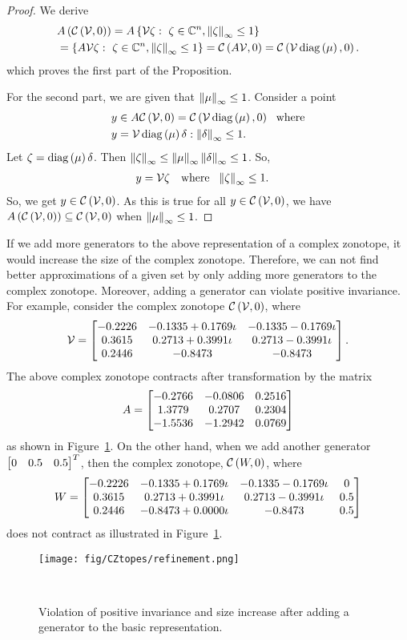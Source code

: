 % 
\begin{proof}
We derive
\begin{align*}
& A\left(\mathit{\mathcal{C}}\left(\mathcal{V},0\right)\right) =
A\left\{\mathcal{V}\zeta:~\zeta\in\mathbb{C}^n,\left\|\zeta\right\|_{\infty}\leq 1\right\}\\
& =\left\{A\mathcal{V}\zeta:~\zeta\in\mathbb{C}^n,\left\|\zeta\right\|_{\infty}\leq 1\right\}
= \mathit{\mathcal{C}}\left(A\mathcal{V},0\right)=\mathit{\mathcal{C}}\left(\mathcal{V}\operatorname{diag}\left(\mu\right),0\right).
\end{align*}
%
which proves the first part of the
Proposition.

For the second part, we are given that $\left\|\mu\right\|_{\infty}\leq 1$.
Consider a point
%
\begin{align*}
  & y\in A\mathit{\mathcal{C}}\left(\mathcal{V},0\right)=\mathit{\mathcal{C}}\left(\mathcal{V}\operatorname{diag}\left(\mu\right),0\right)~~\text{where}\\
  &y = \mathcal{V}\operatorname{diag}\left(\mu\right)\delta:\left\|\delta\right\|_{\infty}\leq
1.
\end{align*}
%
Let $\zeta = \operatorname{diag}\left(\mu\right)\delta$. Then $\left\|\zeta\right\|_{\infty} \leq
\left\|\mu\right\|_{\infty}\left\|\delta\right\|_{\infty} \leq 1$.  So,
%
\begin{align*}
  & y=\mathcal{V}\zeta~~\text{ where }~
  \left\|\zeta\right\|_{\infty}\leq 1.
\end{align*}
%
So, we get $y\in \mathit{\mathcal{C}}\left(\mathcal{V},0\right)$.  As this is true for all
$y\in\mathit{\mathcal{C}}\left(\mathcal{V},0\right)$, we have
$A\left(\mathit{\mathcal{C}}\left(\mathcal{V},0\right)\right)\subseteq
\mathit{\mathcal{C}}\left(\mathcal{V},0\right)$ when $\left\|\mu\right\|_{\infty}\leq 1$.
\end{proof}

If we add more generators to the above representation of a complex
zonotope, it would increase the size of the complex zonotope.
Therefore, we can not find better approximations of a given set by
only adding more generators to the complex zonotope.  Moreover, adding
a generator can violate positive invariance.  For example, consider
the complex zonotope $\mathit{\mathcal{C}}\left(\mathcal{V},0\right)$, where
%
\[
\mathcal{V} = \left[\begin{matrix}-0.2226 &  -0.1335 + 0.1769\iota &   -0.1335 - 0.1769\iota\\
   0.3615  &   0.2713 + 0.3991\iota &   0.2713 - 0.3991\iota\\
   0.2446  &   -0.8473 &  -0.8473\end{matrix}\right].
\]
%
The above complex zonotope contracts after transformation by the matrix
%
\[
A = \left[\begin{matrix}-0.2766 &   -0.0806 &    0.2516\\
    1.3779  &  0.2707  &   0.2304\\
   -1.5536 &  -1.2942 &    0.0769\end{matrix}\right]
\]
%
as shown in Figure~\ref{fig:refinement}.  On the other hand, when we
add another generator $\left[\begin{matrix}0 & 0.5 & 0.5\end{matrix}\right]^T$, then the complex
zonotope, $\mathit{\mathcal{C}}\left(W,0\right)$, where
%
\[
W=\left[\begin{matrix}-0.2226 &  -0.1335 + 0.1769\iota &   -0.1335 -
   0.1769\iota & 0\\
   0.3615 &   0.2713 + 0.3991\iota &   0.2713 -
   0.3991\iota & 0.5\\
   0.2446 &   -0.8473 + 0.0000\iota &  -0.8473 & 0.5\end{matrix}\right]
\]
%
does not contract as illustrated in Figure~\ref{fig:refinement}.
%
\begin{figure}
\center
\texttt{[image: fig/CZtopes/refinement.png]}
\caption{Violation of positive invariance and size increase after
adding a generator to the basic representation.}~\label{fig:refinement}
\end{figure}

